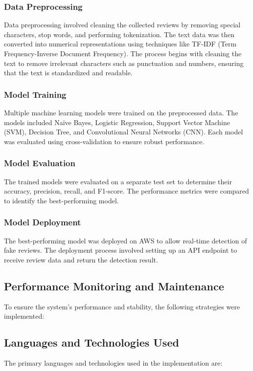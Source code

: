 \subsubsection{Data Preprocessing}
Data preprocessing involved cleaning the collected reviews by removing special characters, stop words, and performing tokenization. The text data was then converted into numerical representations using techniques like TF-IDF (Term Frequency-Inverse Document Frequency).
The process begins with cleaning the text to remove irrelevant characters such as punctuation and numbers, ensuring that the text is standardized and readable.

\subsubsection{Model Training}
Multiple machine learning models were trained on the preprocessed data. The models included Naïve Bayes, Logistic Regression, Support Vector Machine (SVM), Decision Tree, and Convolutional Neural Networks (CNN). Each model was evaluated using cross-validation to ensure robust performance.

\subsubsection{Model Evaluation}
The trained models were evaluated on a separate test set to determine their accuracy, precision, recall, and F1-score. The performance metrics were compared to identify the best-performing model.

\subsubsection{Model Deployment}
The best-performing model was deployed on AWS to allow real-time detection of fake reviews. The deployment process involved setting up an API endpoint to receive review data and return the detection result.

\subsection{Performance Monitoring and Maintenance}
To ensure the system's performance and stability, the following strategies were implemented:

\subsection{Languages and Technologies Used}
The primary languages and technologies used in the implementation are:

